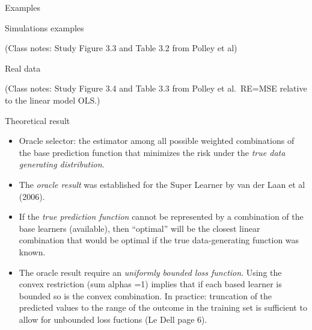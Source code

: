 \documentclass[
  ignorenonframetext,
]{beamer}
\providecommand{\tightlist}{%
  \setlength{\itemsep}{0pt}\setlength{\parskip}{0pt}}
\begin{document}
\begin{frame}

\begin{block}{Examples}

\begin{block}{Simulations examples}

(Class notes: Study Figure 3.3 and Table 3.2 from Polley et al)

\end{block}

\begin{block}{Real data}

(Class notes: Study Figure 3.4 and Table 3.3 from Polley et al.~RE=MSE
relative to the linear model OLS.)

\end{block}

\end{block}

\end{frame}

\begin{frame}

\begin{block}{Theoretical result}

\begin{itemize}
\tightlist
\item
  Oracle selector: the estimator among all possible weighted
  combinations of the base prediction function that minimizes the risk
  under the \emph{true data generating distribution}.
\item
  The \emph{oracle result} was established for the Super Learner by van
  der Laan et al (2006).
\item
  If the \emph{true prediction function} cannot be represented by a
  combination of the base learners (available), then ``optimal'' will be
  the closest linear combination that would be optimal if the true
  data-generating function was known.
\item
  The oracle result require an \emph{uniformly bounded loss function}.
  Using the convex restriction (sum alphas =1) implies that if each
  based learner is bounded so is the convex combination. In practice:
  truncation of the predicted values to the range of the outcome in the
  training set is sufficient to allow for unbounded loss fuctions (Le
  Dell page 6).
\end{itemize}

\end{block}

\end{frame}
\end{document}
